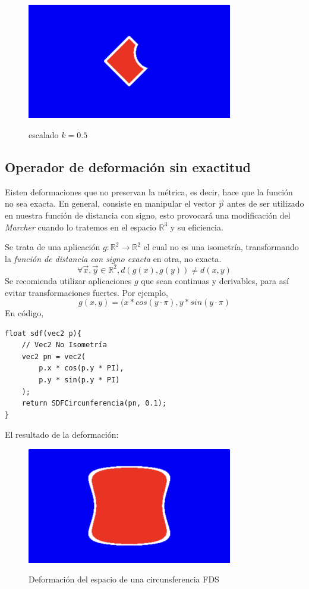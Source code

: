 \begin{figure}[H]
  \centering
  \captionsetup{justification=centering}%
  \includegraphics[width=0.8\textwidth]{secciones/imagenes/sdf_subtracted_scale.jpeg}\label{fig:substraction}
  \caption{ escalado \(k=0.5\)}
\end{figure}

\subsection{Operador de deformación sin exactitud}
Eisten deformaciones que no preservan la métrica, es decir, hace que la función no sea exacta. En general, consiste en manipular el vector \(\Vec{p}\) antes de ser utilizado en nuestra función de distancia con signo, esto provocará una modificación del \textit{Marcher} cuando lo tratemos en el espacio \( \mathbb{R}^3 \) y su eficiencia.

Se trata de una aplicación \(g:\mathbb{R}^2\longrightarrow \mathbb{R}^2\) el cual no es una isometría, transformando la \textit{función de distancia con signo exacta} en otra, no exacta.
\[ \forall \Vec{x}, \Vec{y} \in \mathbb{R}^2, d(g(x), g(y)) \neq d(x,y) \]
Se recomienda utilizar aplicaciones \( g\) que sean continuas y derivables, para así evitar transformaciones fuertes. Por ejemplo,
\[g(x,y)=(x * cos(y \cdot \pi), y * sin(y \cdot \pi)\]
En código,
\begin{lstlisting}
float sdf(vec2 p){
	// Vec2 No Isometría
	vec2 pn = vec2(
	    p.x * cos(p.y * PI),
	    p.y * sin(p.y * PI)
	);
	return SDFCircunferencia(pn, 0.1);
}
\end{lstlisting}
El resultado de la deformación:
\begin{figure}[H]
  \centering
  \captionsetup{justification=centering}%
  \includegraphics[width=0.8\textwidth]{secciones/imagenes/sdf_deform.jpeg}\label{fig:deform}
  \caption{Deformación del espacio de una circunsferencia FDS}
\end{figure}

